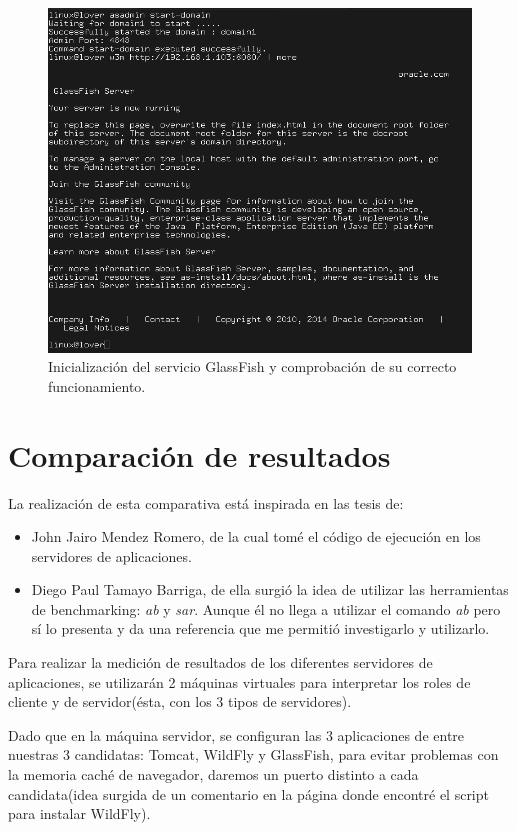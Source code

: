 \documentclass[a4paper, 10pt]{article}
\begin{document}
		\begin{figure}[h!]
			\includegraphics[width=15cm]{Success_GF.png}
			\caption{Inicialización del servicio GlassFish y comprobación de su correcto funcionamiento.}
			\label{fig:GF_Success}
		\end{figure}

\section{Comparación de resultados}
	La realización de esta comparativa está inspirada en las tesis de:
		\begin{itemize}
			\item John Jairo Mendez Romero\cite{JJMR_Tesis}, de la cual tomé el código de
			ejecución en los servidores de aplicaciones.
			
			\item Diego Paul Tamayo Barriga\cite{DPTB_Tesis}, de ella surgió la idea de utilizar
			las herramientas de benchmarking: \textit{ab} y \textit{sar}. Aunque él no llega a
			utilizar el comando \textit{ab} pero sí lo presenta y da una referencia que me
			permitió investigarlo y utilizarlo.
		\end{itemize}

	Para realizar la medición de resultados de los diferentes servidores de aplicaciones, se
	utilizarán 2 máquinas virtuales para interpretar los roles de cliente y de servidor(ésta, con
	los 3 tipos de servidores).
	
	Dado que en la máquina servidor, se configuran las 3 aplicaciones de entre nuestras 3 
	candidatas: Tomcat, WildFly y GlassFish, para evitar problemas con la memoria caché de navegador,
	daremos un puerto distinto a cada candidata(idea surgida de un comentario en la página donde encontré
	el script para instalar WildFly\cite{WF_solution}).
	
\end{document}
